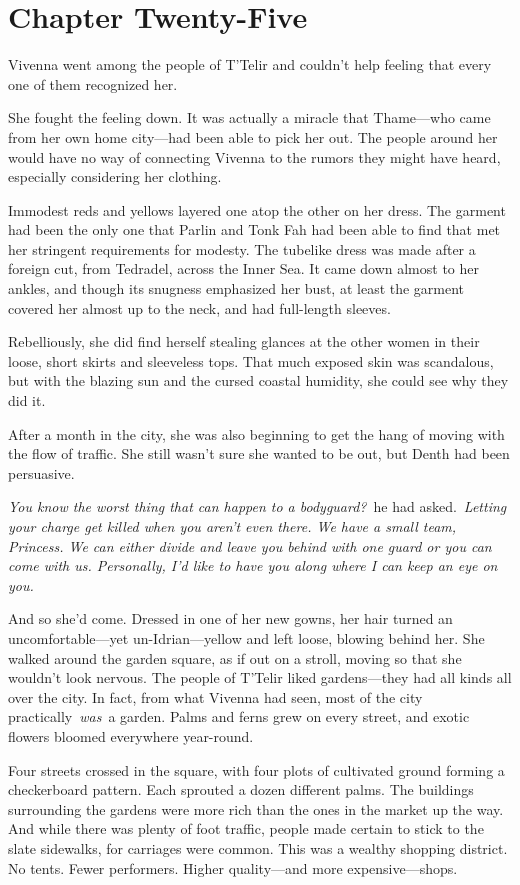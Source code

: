 \section{Chapter Twenty-Five}

Vivenna went among the people of T’Telir and couldn’t help feeling that every one of them recognized her.

She fought the feeling down. It was actually a miracle that Thame—who came from her own home city—had been able to pick her out. The people around her would have no way of connecting Vivenna to the rumors they might have heard, especially considering her clothing.

Immodest reds and yellows layered one atop the other on her dress. The garment had been the only one that Parlin and Tonk Fah had been able to find that met her stringent requirements for modesty. The tubelike dress was made after a foreign cut, from Tedradel, across the Inner Sea. It came down almost to her ankles, and though its snugness emphasized her bust, at least the garment covered her almost up to the neck, and had full-length sleeves.

Rebelliously, she did find herself stealing glances at the other women in their loose, short skirts and sleeveless tops. That much exposed skin was scandalous, but with the blazing sun and the cursed coastal humidity, she could see why they did it.

After a month in the city, she was also beginning to get the hang of moving with the flow of traffic. She still wasn’t sure she wanted to be out, but Denth had been persuasive.

\textit{You know the worst thing that can happen to a bodyguard?}~he had asked.~\textit{Letting your charge get killed when you aren’t even there. We have a small team, Princess. We can either divide and leave you behind with one guard or you can come with us. Personally, I’d like to have you along where I can keep an eye on you.}

And so she’d come. Dressed in one of her new gowns, her hair turned an uncomfortable—yet un-Idrian—yellow and left loose, blowing behind her. She walked around the garden square, as if out on a stroll, moving so that she wouldn’t look nervous. The people of T’Telir liked gardens—they had all kinds all over the city. In fact, from what Vivenna had seen, most of the city practically~\textit{was}~a garden. Palms and ferns grew on every street, and exotic flowers bloomed everywhere year-round.

Four streets crossed in the square, with four plots of cultivated ground forming a checkerboard pattern. Each sprouted a dozen different palms. The buildings surrounding the gardens were more rich than the ones in the market up the way. And while there was plenty of foot traffic, people made certain to stick to the slate sidewalks, for carriages were common. This was a wealthy shopping district. No tents. Fewer performers. Higher quality—and more expensive—shops.

